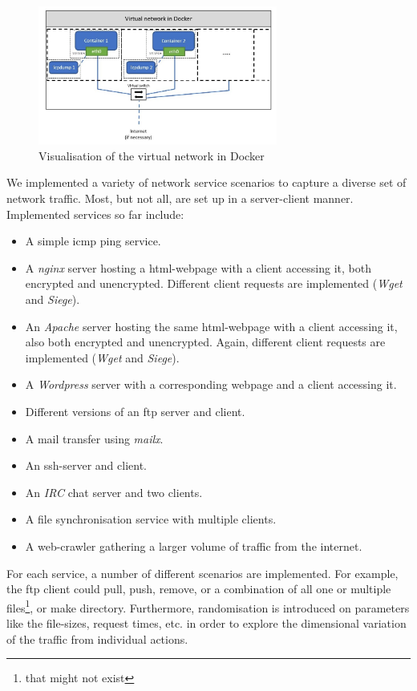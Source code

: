 \documentclass[a4paper,12pt,twoside]{report}
\begin{document}
\begin{figure}\label{graph}
\centering
\includegraphics[width=0.7\textwidth]{images/Dockernet.jpg}
\caption{Visualisation of the virtual network in Docker}
\end{figure}

We implemented a variety of network service  scenarios to capture a diverse set of network traffic. Most, but not all, are set up in a server-client manner. Implemented services so far include:

\begin{itemize}
\item A simple icmp ping service.
\item A \textit{nginx} server hosting a html-webpage with a client accessing it, both encrypted and unencrypted. Different client requests are implemented (\textit{Wget} and \textit{Siege}).
\item An \textit{Apache} server hosting the same html-webpage with a client accessing it, also both encrypted and unencrypted. Again, different client requests are implemented (\textit{Wget} and \textit{Siege}).
\item A \textit{Wordpress} server with a corresponding webpage and a client accessing it.
\item Different versions of an ftp server and client.
\item A mail transfer using \textit{mailx}.
\item An ssh-server and client.
\item An \textit{IRC} chat server and two clients.
\item A file synchronisation service with multiple clients.
\item A web-crawler gathering a larger volume of traffic from the internet.
\end{itemize}

For each service, a number of different scenarios are implemented. For example, the ftp client could pull, push, remove, or a combination of all one or multiple files\footnote{that might not exist}, or make directory. Furthermore, randomisation is introduced on parameters like the file-sizes, request times, etc. in order to explore the dimensional variation of the traffic from individual actions.
\end{document}
